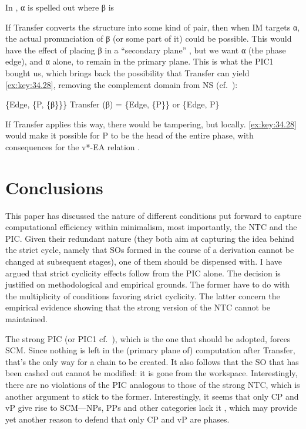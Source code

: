 \documentclass[output=paper]{langsci/langscibook}
\begin{document}
\ea%
    \label{ex:key:34.27}
    In , α is spelled out where β is \parencite[199]{Chomsky2004}
\z

If Transfer converts the structure into some kind of pair, then when \gls{IM}
targets α, the actual pronunciation of β (or some part of it) could be
possible.  This would have the effect of placing β in a “secondary plane”
\citep{Chomsky2004}, but we want α (the phase edge), and α alone, to remain in
the primary plane.  This is what the PIC1 bought us, which brings back the
possibility that Transfer can yield \eqref{ex:key:34.28}, removing the complement domain from
\gls{NS} (cf.~\cite{Ott2011}):

\ea%
    \label{ex:key:34.28}
	\ea \{Edge, \{P, \{β\}\}\}
	\ex Transfer (β) = \{Edge, \{P\}\} or \{Edge, P\}
	\z
\z

If Transfer applies this way, there would be tampering, but locally. \eqref{ex:key:34.28} would
make it possible for P to be the head of the entire phase, with consequences
for the v*-\gls{EA} relation \parencite[cf.][]{EpShim2015}.

\section{Conclusions}\label{sec:34.5}

This paper has discussed the nature of different conditions put forward to
capture computational efficiency within minimalism, most importantly, the
\gls{NTC} and the \gls{PIC}. Given their redundant nature (they both aim at
capturing the idea behind the strict cycle, namely that \glspl{SO} formed in
the course of a derivation cannot be changed at subsequent stages), one of them
should be dispensed with.  I have argued that strict cyclicity effects follow
from the \gls{PIC} alone. The decision is justified on methodological and
empirical grounds. The former have to do with the multiplicity of conditions
favoring strict cyclicity. The latter concern the empirical evidence showing
that the strong version of the \gls{NTC} cannot be maintained.

The strong \gls{PIC} (or PIC1 cf.~\citealt{Chomsky2000}), which is the one that
should be adopted, forces \gls{SCM}. Since nothing is left in the (primary
plane of) computation after Transfer, that’s the only way for a chain to be
created. It also follows that the \gls{SO} that has been cashed out cannot be
modified: it is gone from the workspace. Interestingly, there are no violations
of the \gls{PIC} analogous to those of the strong \gls{NTC}, which is another
argument to stick to the former. Interestingly, it seems that only CP and vP
give rise to SCM—NPs, PPs and other categories lack it
\parencite[cf.][]{Gallego2012,vanUrk2016}, which may provide yet another reason
to defend that only CP and vP are phases.
\end{document}
